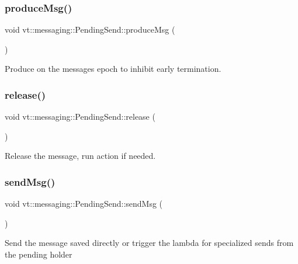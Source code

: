 \subsubsection{\texorpdfstring{produce\+Msg()}{produceMsg()}}
{\footnotesize\ttfamily void vt\+::messaging\+::\+Pending\+Send\+::produce\+Msg (\begin{DoxyParamCaption}{ }\end{DoxyParamCaption})\hspace{0.3cm}{\ttfamily [private]}}



Produce on the messages epoch to inhibit early termination. 

\mbox{\label{structvt_1_1messaging_1_1_pending_send_ad4b41412f953dcd22b3e3020a812f757}} 
\subsubsection{\texorpdfstring{release()}{release()}}
{\footnotesize\ttfamily void vt\+::messaging\+::\+Pending\+Send\+::release (\begin{DoxyParamCaption}{ }\end{DoxyParamCaption})}



Release the message, run action if needed. 

\mbox{\label{structvt_1_1messaging_1_1_pending_send_a93da625c74a5d35ca0b7dec3fad86152}} 
\subsubsection{\texorpdfstring{send\+Msg()}{sendMsg()}}
{\footnotesize\ttfamily void vt\+::messaging\+::\+Pending\+Send\+::send\+Msg (\begin{DoxyParamCaption}{ }\end{DoxyParamCaption})\hspace{0.3cm}{\ttfamily [private]}}

Send the message saved directly or trigger the lambda for specialized sends from the pending holder 

